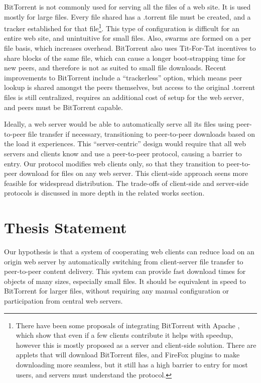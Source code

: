 
BitTorrent is not commonly used for serving all the files of a web site.  It is used mostly for large files.  Every file shared has a .torrent file must be created, and a tracker established for that file\footnote{There have been some proposals of integrating BitTorrent with Apache \cite{webtorrent}, which show that even if a few clients contribute it helps with speedup, however this is mostly proposed as a server and client-side solution.  There are applets that will download BitTorrent files, and FireFox plugins to make downloading more seamless, but it still has a high barrier to entry for most users, and servers must understand the protocol.}.  This type of configuration is difficult for an entire web site, and unintuitive for small files.  Also, swarms are formed on a per file basis, which increases overhead.  BitTorrent also uses Tit-For-Tat incentives to share blocks of the same file, which can cause a longer boot-strapping time for new peers, and therefore is not as suited to small file downloads.  Recent improvements to BitTorrent include a ``trackerless'' option, which means peer lookup is shared amongst the peers themselves, but access to the original .torrent files is still centralized, requires an additional cost of setup for the web server, and peers must be BitTorrent capable.

Ideally, a web server would be able to automatically serve all its files using peer-to-peer file transfer if necessary, transitioning to peer-to-peer downloads based on the load it experiences.  This ``server-centric'' design would require that all web servers and clients know and use a peer-to-peer protocol, causing a barrier to entry.  Our protocol modifies web clients only, so that they transition to peer-to-peer download for files on any web server.  This client-side approach seens more feasible for widespread distribution.  The trade-offs of client-side and server-side protocols is discussed in more depth in the related works section.

\section {Thesis Statement}\label{section:thesis}
Our hypothesis is that a system of cooperating web clients can reduce load on an origin web server by automatically switching from client-server file transfer to peer-to-peer content delivery.  This system can provide fast download times for objects of many sizes, especially small files.  It should be equivalent in speed to BitTorrent for larger files, without requiring any manual configuration or participation from central web servers.

